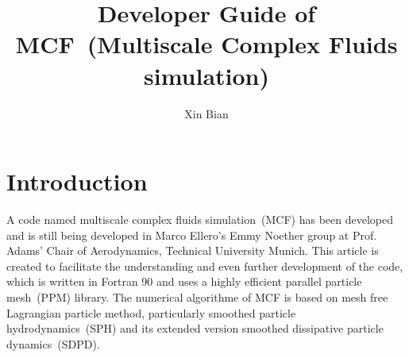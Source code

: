 \documentclass[a4paper,10pt]{article}
\title{Developer Guide of MCF~(Multiscale Complex Fluids simulation)}
\author{Xin Bian}
\begin{document}
\maketitle

\begin{abstract}
\end{abstract}

\section{Introduction}
A code named multiscale complex fluids simulation~(MCF)
has been developed and is still being developed in
Marco Ellero's Emmy Noether group
at Prof. Adams' Chair of Aerodynamics,
Technical University Munich.
This article is created
to facilitate the understanding and 
even further development of the code,
which is written in Fortran 90 and
uses a highly efficient parallel particle mesh~(PPM)\cite{Sbalzarini2006} library.
The numerical algorithme of MCF is based on
mesh free Lagrangian particle method,
particularly smoothed particle hydrodynamics~(SPH)
and its extended version smoothed dissipative particle dynamics~(SDPD).



\end{document}
